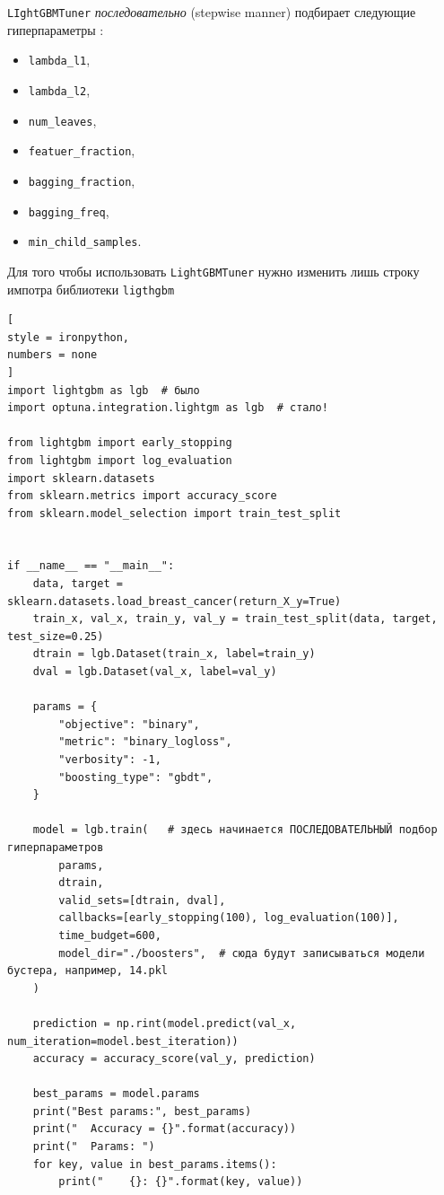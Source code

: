 \documentclass[%
	11pt,
	a4paper,
	utf8,
		]{article}
\begin{document}
\verb|LIghtGBMTuner| \emph{последовательно} (stepwise manner) подбирает следующие гиперпараметры :
\begin{itemize}
	\item \verb|lambda_l1|,
	
	\item \verb|lambda_l2|,
	
	\item \verb|num_leaves|,
	
	\item \verb|featuer_fraction|,
	
	\item \verb|bagging_fraction|,
	
	\item \verb|bagging_freq|,
	
	\item \verb|min_child_samples|.
\end{itemize}

Для того чтобы использовать \verb|LightGBMTuner| нужно изменить лишь строку импотра библиотеки \verb|ligthgbm|

\begin{lstlisting}[
style = ironpython,
numbers = none
]
import lightgbm as lgb  # было
import optuna.integration.lightgm as lgb  # стало!

from lightgbm import early_stopping
from lightgbm import log_evaluation
import sklearn.datasets
from sklearn.metrics import accuracy_score
from sklearn.model_selection import train_test_split


if __name__ == "__main__":
	data, target = sklearn.datasets.load_breast_cancer(return_X_y=True)
	train_x, val_x, train_y, val_y = train_test_split(data, target, test_size=0.25)
	dtrain = lgb.Dataset(train_x, label=train_y)
	dval = lgb.Dataset(val_x, label=val_y)

	params = {
		"objective": "binary",
		"metric": "binary_logloss",
		"verbosity": -1,
		"boosting_type": "gbdt",
	}

	model = lgb.train(   # здесь начинается ПОСЛЕДОВАТЕЛЬНЫЙ подбор гиперпараметров
		params,
		dtrain,
		valid_sets=[dtrain, dval],
		callbacks=[early_stopping(100), log_evaluation(100)],
		time_budget=600,
		model_dir="./boosters",  # сюда будут записываться модели бустера, например, 14.pkl
	)
	
	prediction = np.rint(model.predict(val_x, num_iteration=model.best_iteration))
	accuracy = accuracy_score(val_y, prediction)
	
	best_params = model.params
	print("Best params:", best_params)
	print("  Accuracy = {}".format(accuracy))
	print("  Params: ")
	for key, value in best_params.items():
		print("    {}: {}".format(key, value))
\end{lstlisting}
\end{document}
